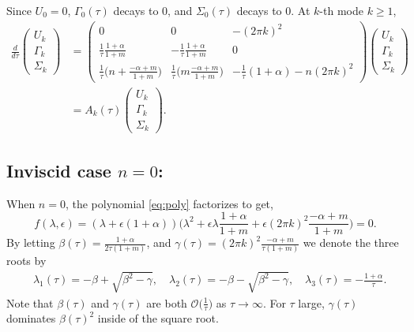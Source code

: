 \documentclass[a4paper,11pt]{article}
\def\k{(2\pi k)}
\theoremstyle{remark}
\begin{document}
Since $U_0=0$, $\Gamma_0(\tau)$ decays to $0$, and $\Sigma_0(\tau)$ decays to $0$.
At $k$-th mode $k\ge1$,
\begin{align}
  \frac{d}{d\tau}
  \begin{pmatrix}
   U_k \\ \Gamma_k \\ \Sigma_k
  \end{pmatrix} &=
  \begin{pmatrix}
   0 & 0 & -(2\pi k)^2\\
   \frac{1}{\tau}\frac{1+\alpha}{1+m} & -\frac{1}{\tau}\frac{1+\alpha}{1+m} & 0\\
   \frac{1}{\tau}\Big( n+ \frac{-\alpha+m}{1+m}\Big) &
   \frac{1}{\tau}\Big(m\frac{-\alpha+m}{1+m}\Big) &
   -\frac{1}{\tau}(1+\alpha) -n(2\pi k)^2
  \end{pmatrix}
  \begin{pmatrix}
   U_k \\ \Gamma_k \\ \Sigma_k
  \end{pmatrix} \nonumber\\
  &=A_k(\tau)\begin{pmatrix}
   U_k \\ \Gamma_k \\ \Sigma_k
  \end{pmatrix}.  \label{eq:k-system}
\end{align}
\subsection{Inviscid case $n=0$:}
When $n=0$, the polynomial \eqref{eq:poly} factorizes to get,
$$ f(\lambda,\epsilon) = (\lambda +\epsilon(1+\alpha))\Big( \lambda^2 + \epsilon\lambda \frac{1+\alpha}{1+m} + \epsilon (2\pi k)^2 \frac{-\alpha+m}{1+m}\Big)=0.$$
By letting $\beta(\tau) = \frac{1+\alpha}{2\tau(1+m)}$, and $\gamma(\tau)= \k^2\frac{-\alpha+m}{\tau(1+m)}$ we denote the three roots by
\begin{equation}
\begin{aligned}
 &\lambda_1(\tau) = -\beta + \sqrt{\beta^2-\gamma}, \quad \lambda_2(\tau) = -\beta - \sqrt{\beta^2-\gamma}, \quad \lambda_3(\tau) = -\frac{1+\alpha}{\tau}.
\end{aligned}
\end{equation}
Note that $\beta(\tau)$ and $\gamma(\tau)$ are both $\mathcal{O}\big(\frac{1}{\tau}\big)$ as $\tau \rightarrow \infty$. For $\tau$ large, $\gamma(\tau)$ dominates $\beta(\tau)^2$ inside of the square root.
\end{document}
